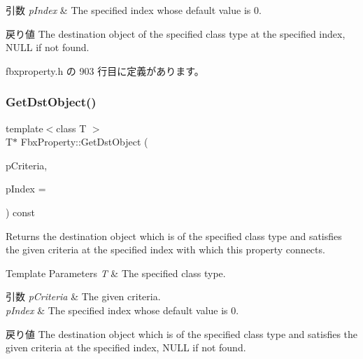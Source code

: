 \begin{DoxyParams}{引数}
{\em p\+Index} & The specified index whose default value is 0. \\
\hline
\end{DoxyParams}
\begin{DoxyReturn}{戻り値}
The destination object of the specified class type at the specified index, N\+U\+LL if not found. 
\end{DoxyReturn}


 fbxproperty.\+h の 903 行目に定義があります。

\mbox{\label{class_fbx_property_af7d61576c53b6b0d1dbf0f0d0a27ad3d}} 
\subsubsection{\texorpdfstring{Get\+Dst\+Object()}{GetDstObject()}\hspace{0.1cm}{\footnotesize\ttfamily [4/4]}}
{\footnotesize\ttfamily template$<$class T $>$ \\
T$\ast$ Fbx\+Property\+::\+Get\+Dst\+Object (\begin{DoxyParamCaption}\item[{const \hyperlink{class_fbx_criteria}{Fbx\+Criteria} \&}]{p\+Criteria,  }\item[{const int}]{p\+Index = {} }\end{DoxyParamCaption}) const\hspace{0.3cm}{\ttfamily [inline]}}

Returns the destination object which is of the specified class type and satisfies the given criteria at the specified index with which this property connects. 
\begin{DoxyTemplParams}{Template Parameters}
{\em T} & The specified class type. \\
\hline
\end{DoxyTemplParams}

\begin{DoxyParams}{引数}
{\em p\+Criteria} & The given criteria. \\
\hline
{\em p\+Index} & The specified index whose default value is 0. \\
\hline
\end{DoxyParams}
\begin{DoxyReturn}{戻り値}
The destination object which is of the specified class type and satisfies the given criteria at the specified index, N\+U\+LL if not found. 
\end{DoxyReturn}


